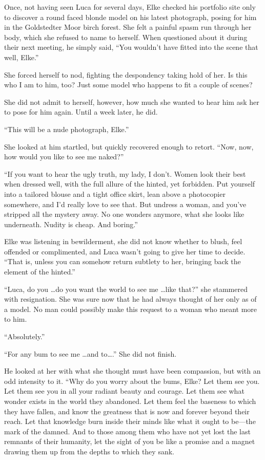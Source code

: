 Once, not having seen Luca for several days, Elke checked his portfolio site only to discover a round faced blonde model on his latest photograph, posing for him in the Goldstedter Moor birch forest. She felt a painful spasm run through her body, which she refused to name to herself. When questioned about it during their next meeting, he simply said, ``You wouldn't have fitted into the scene that well, Elke.''

She forced herself to nod, fighting the despondency taking hold of her. Is this who I am to him, too? Just some model who happens to fit a couple of scenes?

She did not admit to herself, however, how much she wanted to hear him ask her to pose for him again. Until a week later, he did.

\sectionline

``This will be a nude photograph, Elke.''

She looked at him startled, but quickly recovered enough to retort. ``Now, now, how would you like to see me naked?''

``If you want to hear the ugly truth, my lady, I don't. Women look their best when dressed well, with the full allure of the hinted, yet forbidden. Put yourself into a tailored blouse and a tight office skirt, lean above a photocopier somewhere, and I'd really love to see that. But undress a woman, and you've stripped all the mystery away. No one wonders anymore, what she looks like underneath. Nudity is cheap. And boring.''

Elke was listening in bewilderment, she did not know whether to blush, feel offended or complimented, and Luca wasn't going to give her time to decide. ``That is, unless you can somehow return subtlety to her, bringing back the element of the hinted.''

``Luca, do you \ldots do you want the world to see me \ldots like that?'' she stammered with resignation. She was sure now that he had always thought of her only as of a model. No man could possibly make this request to a woman who meant more to him.

``Absolutely.''

``For any bum to see me \ldots and to\ldots.'' She did not finish.

He looked at her with what she thought must have been compassion, but with an odd intensity to it. ``Why do you worry about the bums, Elke? Let them see you. Let them see you in all your radiant beauty and courage. Let them see what wonder exists in the world they abandoned. Let them feel the baseness to which they have fallen, and know the greatness that is now and forever beyond their reach. Let that knowledge burn inside their minds like what it ought to be---the mark of the damned. And to those among them who have not yet lost the last remnants of their humanity, let the sight of you be like a promise and a magnet drawing them up from the depths to which they sank.

